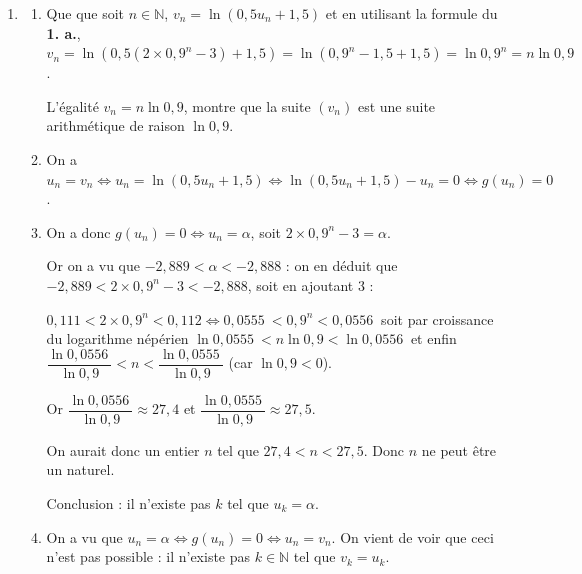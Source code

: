 \documentclass[10pt]{article}
\providecommand{\N}{\mathbb{N}}
\providecommand{\np}[2][]{{#2~#1}}
\begin{document}
\begin{enumerate}
\begin{enumerate}
$g(-2,89) \approx \np{-0,01}$ et $g(-2,88) \approx 0,067$, d'où $-2,89 < \alpha < -2,88$ ;

$g(-2,889) \approx \np{-0,002}$ et $g(-2,888) \approx 0,006$, d'où $-2,889 < \alpha < -2,888$.
	\end{enumerate}
\item 
	\begin{enumerate}
		\item Que que soit $n \in \N$, \: $v_n = \ln \left(0,5 u_n + 1,5\right)$ et en utilisant la formule du \textbf{1. a.}, $v_n = \ln \left(0,5 \left(2 \times 0,9^n - 3\right) + 1,5\right) = \ln \left(0,9^n - 1,5 + 1,5\right) = \ln 0,9^n = n \ln 0,9$.

L'égalité $v_n = n \ln 0,9$, montre que la suite $\left(v_n\right)$ est une suite arithmétique  de raison $\ln 0,9$.
		\item On a $u_n = v_n \iff u_n = \ln \left(0,5 u_n + 1,5\right) \iff \ln \left(0,5 u_n + 1,5\right) - u_n = 0 \iff g\left(u_n\right) = 0$.
		\item On a donc $g\left(u_n\right) = 0 \iff u_n = \alpha$, soit $2 \times 0,9^n - 3 = \alpha$.
		
Or on a vu que  $-2,889 < \alpha < -2,888$  : on en déduit que $-2,889 < 2 \times 0,9^n - 3 < -2,888$, soit en ajoutant 3 :

$0,111 < 2 \times 0,9^n < 0,112 \iff \np{0,0555} < 0,9^n < \np{0,0556}$ soit par croissance du logarithme népérien $\ln \np{0,0555} < n \ln 0,9 < \ln \np{0,0556}$ et enfin 
$\dfrac{\ln \np{0,0556}}{\ln 0,9}< n < \dfrac{\ln \np{0,0555}}{\ln 0,9}$ (car $\ln 0,9 < 0$).

Or $\dfrac{\ln \np{0,0556}}{\ln 0,9} \approx 27,4$ et $\dfrac{\ln \np{0,0555}}{\ln 0,9} \approx 27,5$.

On aurait donc un entier $n$ tel que $27,4 < n < 27,5$. Donc $n$ ne peut être un naturel.

Conclusion : il n'existe pas $k$ tel que $u_k = \alpha$.
\item On a vu que $u_n = \alpha \iff g\left(u_n\right) = 0 \iff u_n = v_n$. On vient de voir que ceci n'est pas possible : il n'existe pas $k \in \N$ tel que $v_k = u_k$.
	\end{enumerate}
\end{enumerate}
\end{document}
